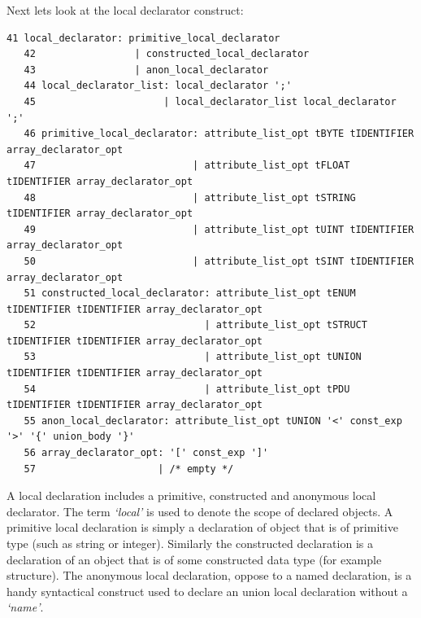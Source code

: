 \documentclass[times, utf8, diplomski]{fer}
\begin{document}
Next lets look at the local declarator construct:
\lstset{language=IDL}
\lstset{basicstyle=\tiny}
\begin{lstlisting}[frame=tb]
   41 local_declarator: primitive_local_declarator
   42                 | constructed_local_declarator
   43                 | anon_local_declarator
   44 local_declarator_list: local_declarator ';'
   45                      | local_declarator_list local_declarator ';'
   46 primitive_local_declarator: attribute_list_opt tBYTE tIDENTIFIER array_declarator_opt
   47                           | attribute_list_opt tFLOAT tIDENTIFIER array_declarator_opt
   48                           | attribute_list_opt tSTRING tIDENTIFIER array_declarator_opt
   49                           | attribute_list_opt tUINT tIDENTIFIER array_declarator_opt  
   50                           | attribute_list_opt tSINT tIDENTIFIER array_declarator_opt  
   51 constructed_local_declarator: attribute_list_opt tENUM tIDENTIFIER tIDENTIFIER array_declarator_opt
   52                             | attribute_list_opt tSTRUCT tIDENTIFIER tIDENTIFIER array_declarator_opt
   53                             | attribute_list_opt tUNION tIDENTIFIER tIDENTIFIER array_declarator_opt 
   54                             | attribute_list_opt tPDU tIDENTIFIER tIDENTIFIER array_declarator_opt   
   55 anon_local_declarator: attribute_list_opt tUNION '<' const_exp '>' '{' union_body '}'
   56 array_declarator_opt: '[' const_exp ']'
   57                     | /* empty */
\end{lstlisting}

A local declaration includes a primitive, constructed and anonymous local declarator.
The term \emph{`local'} is used to denote the scope of declared objects. 
A primitive local declaration is simply a declaration of object that is of 
primitive type (such as string or integer). Similarly the constructed declaration 
is a declaration of an object that is of some constructed data type (for example structure). 
The anonymous local declaration, oppose to a named declaration, is a handy 
syntactical construct used to declare an union local declaration without a 
\emph{`name'}.
\end{document}
